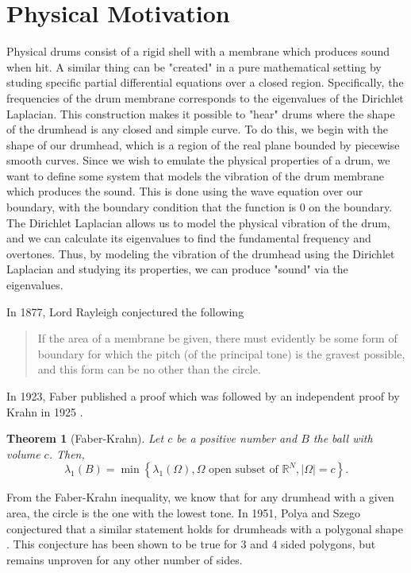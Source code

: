 \documentclass[12pt]{report}
\newtheorem{theorem}{Theorem}[section]
\numberwithin{definition}{section}
\begin{document}
\break
\section {Physical Motivation}


Physical drums consist of a rigid shell with a membrane which produces sound when hit.
A similar thing can be "created" in a pure mathematical setting by studing specific partial differential equations over a closed region.
Specifically, the frequencies of the drum membrane corresponds to the eigenvalues of the Dirichlet Laplacian.
This construction makes it possible to "hear" drums where the shape of the drumhead is any closed and simple curve.
To do this, we begin with the shape of our drumhead, which is a region of the real plane bounded by piecewise smooth curves.
Since we wish to emulate the physical properties of a drum, we want to define some system that models the vibration of the drum membrane which produces the sound.
This is done using the wave equation over our boundary, with the boundary condition that the function is 0 on the boundary.
The Dirichlet Laplacian allows us to model the physical vibration of the drum, and we can calculate its eigenvalues to find the fundamental frequency and overtones.
Thus, by modeling the vibration of the drumhead using the Dirichlet Laplacian and studying its properties, we can produce "sound" via the eigenvalues.

In 1877, Lord Rayleigh conjectured the following \cite{rayleigh}

\begin{quote}
If the area of a membrane be given, there must evidently be some
form of boundary for which the pitch (of the principal tone) is the
gravest possible, and this form can be no other than the circle.
\end{quote}

In 1923, Faber published a proof which was followed by an independent proof by Krahn in 1925 \cite{krahn}.
\begin{theorem}[Faber-Krahn]
 Let $c$ be a positive number and $B$ the ball with volume $c$. Then,
 \[
   \lambda_{1}(B) = \min \left\{ \lambda_{1}(\Omega), \Omega \text{ open subset of } \mathbb{R}^{N}, |\Omega| = c \right\} 
 .\] 
\end{theorem}
From the Faber-Krahn inequality, we know that for any drumhead with a given area, the circle is the one with the lowest tone.
In 1951, Polya and Szego conjectured that a similar statement holds for drumheads with a polygonal shape \cite{henrot}.
This conjecture has been shown to be true for 3 and 4 sided polygons, but remains unproven for any other number of sides.
\end{document}
